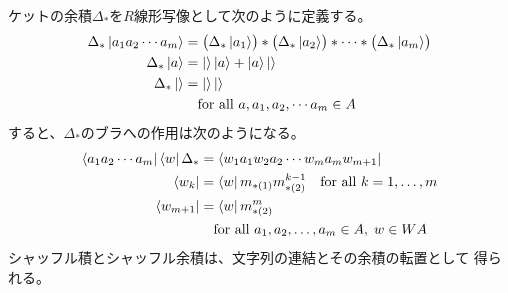 		ケットの余積$\Delta_*$を$R$線形写像として次のように定義する。
		\begin{equation*}\begin{split} %
			\Delta_*\ket{a_1a_2\cdots a_m}
			&= \bigl(\Delta_*\ket{a_1}\bigr) * \bigl(\Delta_*\ket{a_2}\bigr)
				* \cdots * \bigl(\Delta_*\ket{a_m}\bigr) \\
			\Delta_*\ket{a} &= \ket{}\ket{a} + \ket{a}\ket{} \\
			\Delta_*\ket{} &= \ket{}\ket{} \\
			&\quad\text{for all }a,a_1,a_2,\cdots a_m\in A
		\end{split}\end{equation*} %
		すると、$\Delta_*$のブラへの作用は次のようになる。
		\begin{equation*}\begin{split} %
			\bra{a_1a_2\cdots a_m}\bra{w}\Delta_*
				&= \bra{w_1a_1w_2a_2\cdots w_ma_mw_{m+1}} \\
			\bra{w_k} &= \bra{w}m_{*(1)}m_{*(2)}^{k-1} \quad\text{for all }k=1,\dots,m\\
			\bra{w_{m+1}} &= \bra{w}m_{*(2)}^m \\
			&\quad\text{for all }a_1,a_2,\dots,a_m\in A,\;w\in WA
		\end{split}\end{equation*} %
		シャッフル積とシャッフル余積は、文字列の連結とその余積の転置として
		得られる。

